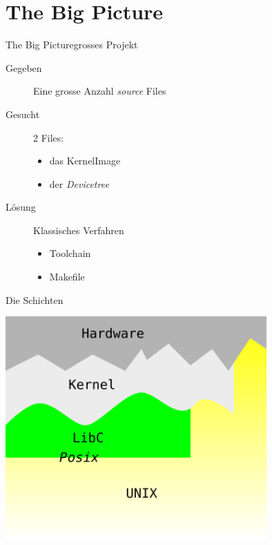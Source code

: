 \section{The Big Picture}
\begin{frame}{The Big Picture}{grosses Projekt}
 \begin{description}
  \item[Gegeben] Eine grosse Anzahl {\em source} Files
  \item[Gesucht] 2 Files:
   \begin{itemize}
    \item das {\Large KernelImage}
    \item der {\em Devicetree}
   \end{itemize}
  \item[Lösung] Klassisches Verfahren
  \begin{itemize}
   \item Toolchain
   \item Makefile
  \end{itemize}
 \end{description}
\end{frame}

\begin{frame}{Die Schichten}
 \begin{center}
  \includegraphics[width=0.75\textwidth]{layers.pdf}
 \end{center}
\end{frame}

